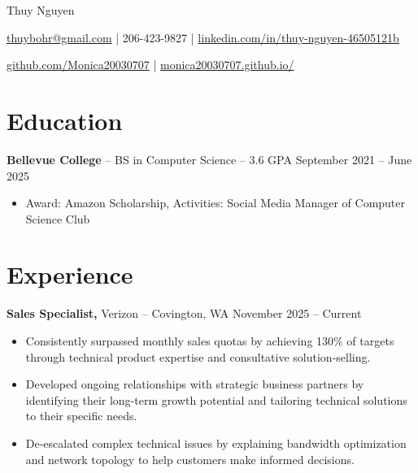 \documentclass[11pt]{article}       %
\begin{document}
\centerline{\Huge Thuy Nguyen}

\vspace{5pt}

\centerline{\href{mailto:thuybohr@gmail.com}{thuybohr@gmail.com} | 206-423-9827 |
\href{https://www.linkedin.com/in/thuy-nguyen-46505121b/}{linkedin.com/in/thuy-nguyen-46505121b}}

\centerline{\href{https://github.com/Monica20030707}{github.com/Monica20030707} | 
\href{https://monica20030707.github.io/}{monica20030707.github.io/}} 

\vspace{-9pt}

\section*{Education}
\textbf{Bellevue College} -- BS in Computer Science -- 3.6 GPA \hfill September 2021 -- June 2025\\
\vspace{-9pt}
\begin{itemize}
  \item Award: Amazon Scholarship, Activities: Social Media Manager of Computer Science Club
\end{itemize}

\vspace{-18.5pt}

\section*{Experience}

\textbf{Sales Specialist,} {Verizon} -- Covington, WA \hfill November 2025 -- Current \\
\vspace{-9pt}
\begin{itemize}
  \item Consistently surpassed monthly sales quotas by achieving 130\% of targets through technical product expertise and consultative solution-selling.
  \item Developed ongoing relationships with strategic business partners by identifying their long-term growth potential and tailoring technical solutions to their specific needs.
  \item De-escalated complex technical issues by explaining bandwidth optimization and network topology to help customers make informed decisions.
\end{itemize}
\end{document}
